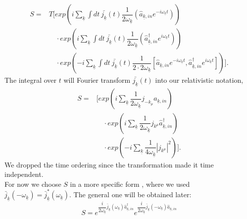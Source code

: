 \documentclass[12pt, titlepage]{article}
\begin{document}
\begin{subappendices}
\begin{equation}
\begin{split}
S=
&T	\Biggl[
    exp
    \left(
       i
    \sum_{\underline{k}}\int dt \ \bar{j_{\underline{k}}}(t)
     	\dfrac{1}{2\omega_{\underline{k}}}
     	\left(
			\hat{a}_{\underline{k},in} 
			e^{-i\omega_{\underline{k}}t}
		\right)    
    \right)
	\\
&\quad\cdot
    exp
    \left(
       i
    \sum_{\underline{k}}\int dt \ \bar{j_{\underline{k}}}(t)
     	\dfrac{1}{2\omega_{\underline{k}}}
     	\left(
			\hat{a}^{\dagger}_{\underline{k},in} 
			e^{i\omega_{\underline{k}}t}
		\right)    
    \right)
	\\
&\quad\cdot
    exp
    \left(
       -i
    \sum_{\underline{k}}\int dt \ \bar{j_{\underline{k}}}(t)
     	\dfrac{1}{2\cdot2\omega_{\underline{k}}}
     	\left[
			\hat{a}_{\underline{k},in} 
			e^{-i\omega_{\underline{k}}t}     	
     	,
			\hat{a}^{\dagger}_{\underline{k},in} 
			e^{i\omega_{\underline{k}}t}
		\right]    
    \right)	
	\Biggr]
	.
\end{split}
\end{equation}
The integral over $ t $ will Fourier transform $ \bar{j_{\underline{k}}}(t) $ into our relativistic notation,
\begin{equation}
\begin{split}
S=&	\Biggl[
    exp
    \left(
     	  i
    	\sum_{\underline{k}}
     	\dfrac{1}{2\omega_{\underline{k}}}
     	j_{-k_{\mu}}
			\hat{a}_{\underline{k},in}  		
    \right)
	\\
&\quad\cdot
    exp
    \left(
       i
    \sum_{\underline{k}}
     	\dfrac{1}{2\omega_{\underline{k}}}
     	j_{k^{\mu}}
			\hat{a}^{\dagger}_{\underline{k},in}     
    \right)
	\\
&\quad\cdot
    exp
    \left(
       -i
    \sum_{\underline{k}}
     	\dfrac{1}{4\omega_{\underline{k}}}
    	|j_{k^{\mu}}|^2
    \right)	
	\Biggr]
	.
\end{split}
\end{equation}
We dropped the time ordering since the transformation made it time independent.
\\
For now we choose $ S $ in a more specific form , where we used $ \bar{j}_{\underline{k}}(-\omega_{\underline{k}}) = \bar{j}^{\ast}_{\underline{k}}(\omega_{\underline{k}})  $. The general one will be obtained later:
\begin{equation}
S=e^{\dfrac{i}{2\omega_{\underline{k}}}\bar{j}_{\underline{k}}(\omega_{\underline{k}})\hat{a}^{\dagger}_{\underline{k},in}}
e^{\dfrac{i}{2\omega_{\underline{k}}}\bar{j}_{\underline{k}}(-\omega_{\underline{k}})\hat{a}_{\underline{k},in}}

\end{equation}
\end{subappendices}
\end{document}
